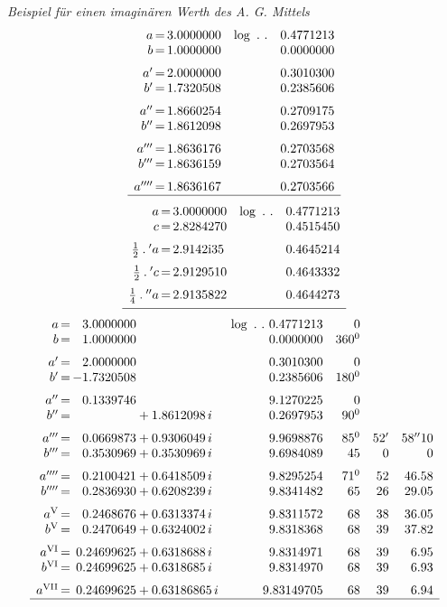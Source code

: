 \par \textit{Beispiel für einen imaginären Werth des A. G. Mittels}
\[
\begin{array}[t]{r@{\,=\,}r l r}
a&3.0000000&\log\ .\ .&0.4771213\\
b&1.0000000&&0.0000000\\[6pt]
a'&2.0000000&&0.3010300\\
b'&1.7320508&&0.2385606\\[6pt]
a''&1.8660254&&0.2709175\\
b''&1.8612098&&0.2697953\\[6pt]
a'''&1.8636176&&0.2703568\\
b'''&1.8636159&&0.2703564\\[6pt]
a''''&1.8636167&&0.2703566\\\hline
\end{array}
\]
\[
\begin{array}[t]{r@{\,=\,}l l r}
a&3.0000000&\log\ .\ .&0.4771213\\
c&2.8284270&&0.4515450\\[6pt]
\frac12\mathbin{.}{}'a&2.9142\mathrm{i}35&&0.4645214\\[6pt]
\frac12\mathbin{.}{}'c&2.9129510&&0.4643332\\[6pt]
\frac14\mathbin{.}{}''a&2.9135822&&0.4644273\\[4pt]\hline
\end{array}
\]
\begingroup\small\setlength{\arraycolsep}{2pt}
\[
\begin{array}{r@{\,=\,}r@{}l r r r r}
a&3.0000000&&\log\ .\ .\ 0.4771213&0&&\\
b&1.0000000&&0.0000000&360^{0}&&\\[6pt]
a'&2.0000000&&0.3010300&0&&\\
b'&-1.7320508&&0.2385606&180^{0}&&\\[6pt]
a''&0.1339746&&9.1270225&0&&\\
b''&&{}+1.8612098\,i&0.2697953&90^{0}&&\\[6pt]
a'''&0.0669873&{}+0.9306049\,i&9.9698876&85^{0}&52'&58''10\\
b'''&0.3530969&{}+0.3530969\,i&9.6984089&45&0&0\\[6pt]
a''''&0.2100421&{}+0.6418509\,i&9.8295254&71^{0}&52&46.58\\
b''''&0.2836930&{}+0.6208239\,i&9.8341482&65&26&29.05\\[6pt]
a^{\mathrm{V}}&0.2468676&{}+0.6313374\,i&9.8311572&68&38&36.05\\
b^{\mathrm{V}}&0.2470649&{}+0.6324002\,i&9.8318368&68&39&37.82\\[6pt]
a^{\mathrm{VI}}&0.24699625&{}+0.6318688\,i&9.8314971&68&39&6.95\\
b^{\mathrm{VI}}&0.24699625&{}+0.6318685\,i&9.8314970&68&39&6.93\\[6pt]
a^{\mathrm{VII}}&0.24699625&{}+0.63186865\,i&9.83149705&68&39&6.94\\\hline
\end{array}
\]
